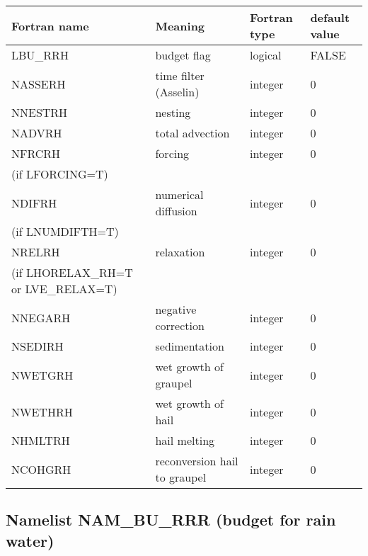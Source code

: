 \begin{center}
\begin{tabular} {|p{8cm}|p{4cm}|>{\centering}p{1.5cm}|p{1.5cm}<{\centering}|}
\hline
Fortran name & Meaning & Fortran type & default value \\
\hline \hline
LBU\_RRH & budget flag & logical & FALSE\index{LBU\_RRH!\innam{NAM\_BU\_RRH}} \\\hline
NASSERH  & time filter (Asselin)   & integer  &  0 \index{NASSERH!\innam{NAM\_BU\_RRH}} \\\hline
NNESTRH  & nesting           & integer  &  0 \index{NNESTRH!\innam{NAM\_BU\_RRH}} \\\hline
NADVRH   & total advection   & integer  &  0 \index{NADVRH!\innam{NAM\_BU\_RTH}}\\\hline
NFRCRH   & forcing           & integer  &  0 \index{NFRCRH!\innam{NAM\_BU\_RRH}} \\
(if LFORCING=T) &  &   &   \\\hline
NDIFRH   & numerical diffusion & integer  &  0 \index{NDIFRH!\innam{NAM\_BU\_RRH}} \\
(if LNUMDIFTH=T) &  &   &   \\\hline
NRELRH   & relaxation        & integer  &  0 \index{NRELRH!\innam{NAM\_BU\_RRH}}\\
(if LHORELAX\_RH=T or LVE\_RELAX=T) &  &   &   \\\hline
NNEGARH  & negative correction & integer  &  0 \index{NNEGARH!\innam{NAM\_BU\_RRH}}\\\hline
NSEDIRH  & sedimentation    & integer  &  0 \index{NSEDIRH!\innam{NAM\_BU\_RRH}}\\\hline
NWETGRH  & wet growth of graupel  & integer  &  0 \index{NWETGRH!\innam{NAM\_BU\_RRH}}\\\hline
NWETHRH  & wet growth of hail  & integer  &  0 \index{NWETHRH!\innam{NAM\_BU\_RRH}}\\\hline
NHMLTRH  & hail melting  & integer  &  0 \index{NHMLTRH!\innam{NAM\_BU\_RRH}}\\\hline
NCOHGRH  & reconversion hail to graupel & integer  &  0 \index{NCOHGRH!\innam{NAM\_BU\_RRH}}\\\hline
\end{tabular}
\end{center}
\newpage
\subsection{Namelist NAM\_BU\_RRR (budget for rain water)}

